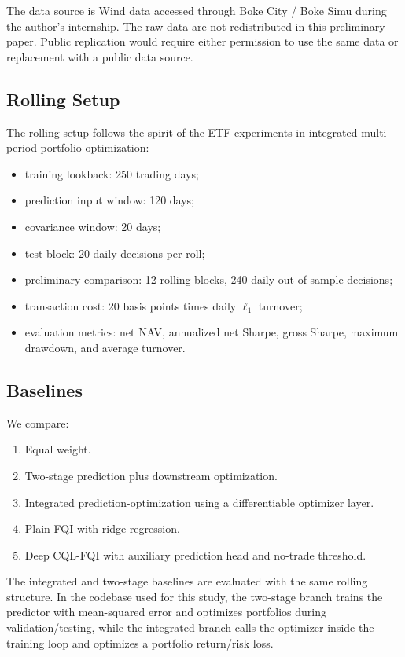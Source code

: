 \documentclass[11pt]{article}
\begin{document}
The data source is Wind data accessed through Boke City / Boke Simu during the author's internship. The raw data are not redistributed in this preliminary paper. Public replication would require either permission to use the same data or replacement with a public data source.

\subsection{Rolling Setup}

The rolling setup follows the spirit of the ETF experiments in integrated multi-period portfolio optimization:
\begin{itemize}[leftmargin=*]
    \item training lookback: 250 trading days;
    \item prediction input window: 120 days;
    \item covariance window: 20 days;
    \item test block: 20 daily decisions per roll;
    \item preliminary comparison: 12 rolling blocks, 240 daily out-of-sample decisions;
    \item transaction cost: 20 basis points times daily $\ell_1$ turnover;
    \item evaluation metrics: net NAV, annualized net Sharpe, gross Sharpe, maximum drawdown, and average turnover.
\end{itemize}

\subsection{Baselines}

We compare:
\begin{enumerate}[leftmargin=*]
    \item Equal weight.
    \item Two-stage prediction plus downstream optimization.
    \item Integrated prediction-optimization using a differentiable optimizer layer.
    \item Plain FQI with ridge regression.
    \item Deep CQL-FQI with auxiliary prediction head and no-trade threshold.
\end{enumerate}

The integrated and two-stage baselines are evaluated with the same rolling structure. In the codebase used for this study, the two-stage branch trains the predictor with mean-squared error and optimizes portfolios during validation/testing, while the integrated branch calls the optimizer inside the training loop and optimizes a portfolio return/risk loss.
\end{document}
